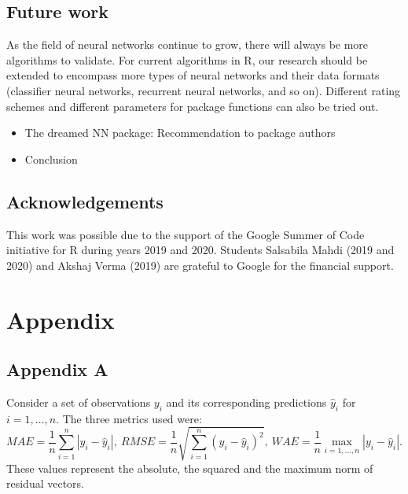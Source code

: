 \hypertarget{future-work}{%
\subsection{Future work}\label{future-work}}

As the field of neural networks continue to grow, there will always be
more algorithms to validate. For current algorithms in R, our research
should be extended to encompass more types of neural networks and their
data formats (classifier neural networks, recurrent neural networks, and
so on). Different rating schemes and different parameters for package
functions can also be tried out.

\begin{itemize}
\tightlist
\item
  The dreamed NN package: Recommendation to package authors
\item
  Conclusion
\end{itemize}

\hypertarget{acknowledgements}{%
\subsection{Acknowledgements}\label{acknowledgements}}

This work was possible due to the support of the Google Summer of Code
initiative for R during years 2019 and 2020. Students Salsabila Mahdi
(2019 and 2020) and Akshaj Verma (2019) are grateful to Google for the
financial support.



\hypertarget{appendix}{%
\section{Appendix}\label{appendix}}

\hypertarget{appendix-a}{%
\subsection{Appendix A}\label{appendix-a}}

Consider a set of observations \(y_i\) and its corresponding predictions
\(\hat y_i\) for \(i=1,\dots,n\). The three metrics used were: \[
MAE = \frac1n\sum_{i=1}^n|y_i - \hat y_i|,~
RMSE = \frac1n\sqrt{\sum_{i=1}^n(y_i - \hat y_i)^2},~
WAE = \frac1n\max_{i=1,\dots,n}|y_i - \hat y_i|.
\] These values represent the absolute, the squared and the maximum norm
of residual vectors.

